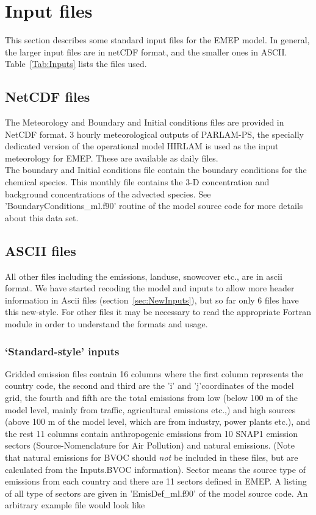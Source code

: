 \chapter{Input files}

This section describes some standard input files for the
EMEP model. In general, the larger input files
are in netCDF format, and the smaller ones in ASCII.
Table~\ref{Tab:Inputs} lists the files used.

\section{NetCDF files}

The Meteorology and Boundary and Initial conditions files are provided
in NetCDF format.  3 hourly meteorological outputs of PARLAM-PS, the
specially dedicated version of the 
operational model HIRLAM is used as the input
meteorology for EMEP.  These are available as daily files. \\

The boundary and Initial conditions file contain the boundary
conditions for the chemical species.  This monthly file contains the
3-D concentration and background concentrations  of the advected
species.  See 'BoundaryConditions\_ml.f90' routine of the model source
code for more details about this data set.  

\section{ASCII files}

All other files including the emissions, landuse, snowcover etc., are
in ascii format.  
We have started recoding the model  and inputs
to allow more header information in Ascii files (section~\ref{sec:NewInputs}), 
but so far only 6 files have
this new-style. For other files it may be necessary to read the
appropriate Fortran module in order to understand the formats and usage.

\subsection{`Standard-style' inputs}

Gridded emission files contain 16 columns where the first column
represents the country code, the second and third are the 'i' and 'j'coordinates of the model grid, the fourth and fifth are the total emissions from
low (below 100 m of the model level, mainly from traffic,
agricultural emissions etc.,) and high sources (above 100 m of the
model level, which are from industry, power plants etc.),
and the rest 11 columns contain anthropogenic emissions from 10 SNAP1
emission sectors (Source-Nomenclature for Air Pollution) and natural emissions. 
(Note that natural emissions for BVOC should \emph{not} be included
in these files, but are calculated from the Inputs.BVOC information).
Sector means
the source type of emissions from each country and there are 11
sectors defined in EMEP.  A listing of all type
of sectors are given in 'EmisDef\_ml.f90' of the model source code.   An arbitrary
example file would look like  \\

